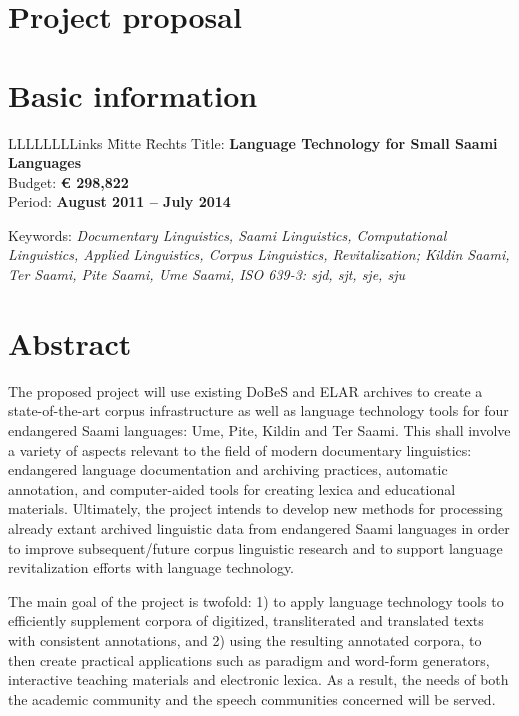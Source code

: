\documentclass[a4paper,12pt]{article}
\begin{document}
\newpage

\section*{Project proposal}

\section{Basic information}

\begin{tabbing}
LLLLLLLLinks \= Mitte \= Rechts \kill
Title: \>\textbf{Language Technology for Small Saami Languages}\\
Budget: \>\textbf{€ 298,822}\\
Period: \>\textbf{August 2011 – July 2014}\\
\end{tabbing}
\begin{flushleft}
Keywords: {\it Documentary Linguistics, Saami Linguistics, Computational Linguistics, Applied Linguistics, Corpus Linguistics, Revitalization; Kildin Saami, Ter Saami, Pite Saami, Ume Saami, ISO 639-3: sjd, sjt, sje, sju}
\end{flushleft}

\section{Abstract} 
The proposed project will use existing DoBeS and ELAR archives to create a state-of-the-art corpus infrastructure as well as language technology tools for four endangered Saami languages: Ume, Pite, Kildin and Ter Saami. This shall involve a variety of aspects relevant to the field of modern documentary linguistics: endangered language documentation and archiving practices, automatic annotation, and computer-aided tools for creating lexica and educational materials. Ultimately, the project intends to develop new methods for processing already extant archived linguistic data from endangered Saami languages in order to improve subsequent/future corpus linguistic research and to support language revitalization efforts with language technology.

The main goal of the project is twofold: 1) to apply language technology tools to efficiently supplement corpora of digitized, transliterated and translated texts with consistent annotations, and 2) using the resulting annotated corpora, to then create practical applications such as paradigm and word-form generators, interactive teaching materials and electronic lexica. As a result, the needs of both the academic community and the speech communities concerned will be served.
\end{document}
